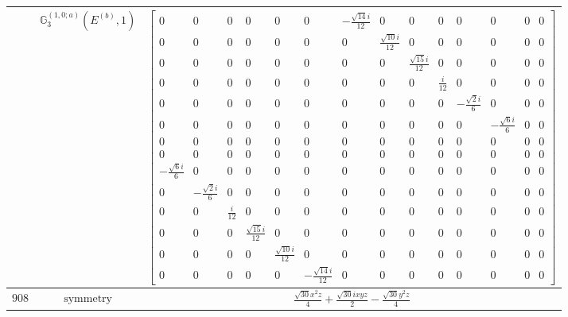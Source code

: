 \documentclass[fleqn,8pt,landscape]{jsarticle}
\begin{document}
\begin{longtable}{ccc}
$  $ & $ \mathbb{G}_{3}^{(1,0;a)}(E^{(b)},1) $ & $ \begin{bmatrix} 0 & 0 & 0 & 0 & 0 & 0 & - \frac{\sqrt{14} i}{12} & 0 & 0 & 0 & 0 & 0 & 0 & 0 \\ 0 & 0 & 0 & 0 & 0 & 0 & 0 & \frac{\sqrt{10} i}{12} & 0 & 0 & 0 & 0 & 0 & 0 \\ 0 & 0 & 0 & 0 & 0 & 0 & 0 & 0 & \frac{\sqrt{15} i}{12} & 0 & 0 & 0 & 0 & 0 \\ 0 & 0 & 0 & 0 & 0 & 0 & 0 & 0 & 0 & \frac{i}{12} & 0 & 0 & 0 & 0 \\ 0 & 0 & 0 & 0 & 0 & 0 & 0 & 0 & 0 & 0 & - \frac{\sqrt{2} i}{6} & 0 & 0 & 0 \\ 0 & 0 & 0 & 0 & 0 & 0 & 0 & 0 & 0 & 0 & 0 & - \frac{\sqrt{6} i}{6} & 0 & 0 \\ 0 & 0 & 0 & 0 & 0 & 0 & 0 & 0 & 0 & 0 & 0 & 0 & 0 & 0 \\ 0 & 0 & 0 & 0 & 0 & 0 & 0 & 0 & 0 & 0 & 0 & 0 & 0 & 0 \\ - \frac{\sqrt{6} i}{6} & 0 & 0 & 0 & 0 & 0 & 0 & 0 & 0 & 0 & 0 & 0 & 0 & 0 \\ 0 & - \frac{\sqrt{2} i}{6} & 0 & 0 & 0 & 0 & 0 & 0 & 0 & 0 & 0 & 0 & 0 & 0 \\ 0 & 0 & \frac{i}{12} & 0 & 0 & 0 & 0 & 0 & 0 & 0 & 0 & 0 & 0 & 0 \\ 0 & 0 & 0 & \frac{\sqrt{15} i}{12} & 0 & 0 & 0 & 0 & 0 & 0 & 0 & 0 & 0 & 0 \\ 0 & 0 & 0 & 0 & \frac{\sqrt{10} i}{12} & 0 & 0 & 0 & 0 & 0 & 0 & 0 & 0 & 0 \\ 0 & 0 & 0 & 0 & 0 & - \frac{\sqrt{14} i}{12} & 0 & 0 & 0 & 0 & 0 & 0 & 0 & 0 \end{bmatrix} $ \\ \hline
$ 908 $ & $ \text{symmetry} $ & $ \frac{\sqrt{30} x^{2} z}{4} + \frac{\sqrt{30} i x y z}{2} - \frac{\sqrt{30} y^{2} z}{4} $ \\

\end{longtable}
\end{document}
